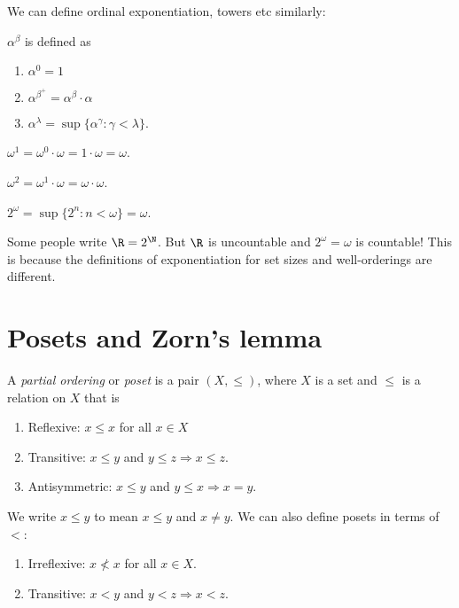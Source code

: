 \documentclass[a4paper]{article}
\begin{document}
We can define ordinal exponentiation, towers etc similarly:
\begin{defi}
  $\alpha^\beta$ is defined as
  \begin{enumerate}
    \item $\alpha^0 = 1$
    \item $\alpha^{\beta^+} = \alpha^\beta \cdot \alpha$
    \item $\alpha^{\lambda} = \sup \{\alpha^\gamma: \gamma< \lambda\}$.
  \end{enumerate}
\end{defi}

\begin{eg}
  $\omega^1 = \omega^0\cdot \omega = 1\cdot \omega = \omega$.

  $\omega^2 = \omega^1\cdot \omega = \omega\cdot \omega$.

  $2^{\omega} = \sup \{2^n: n < \omega\} = \omega$.
\end{eg}
Some people write $\R = 2^{\N}$. But $\R$ is uncountable and $2^\omega = \omega$ is countable! This is because the definitions of exponentiation for set sizes and well-orderings are different.

\section{Posets and Zorn's lemma}
\begin{defi}
  A \emph{partial ordering} or \emph{poset} is a pair $(X, \leq)$, where $X$ is a set and $\leq$ is a relation on $X$ that is
  \begin{enumerate}
    \item Reflexive: $x\leq x$ for all $x\in X$
    \item Transitive: $x \leq y$ and $y \leq z \Rightarrow x \leq z$.
    \item Antisymmetric: $x \leq y$ and $y \leq x \Rightarrow x = y$.
  \end{enumerate}
  We write $x \leq y$ to mean $ x\leq y$ and $x\not= y$. We can also define posets in terms of $<$:
  \begin{enumerate}
    \item Irreflexive: $x \not< x$ for all $x\in X$.
    \item Transitive: $x < y$ and $y < z\Rightarrow  x < z$.
  \end{enumerate}
\end{defi}
\end{document}
